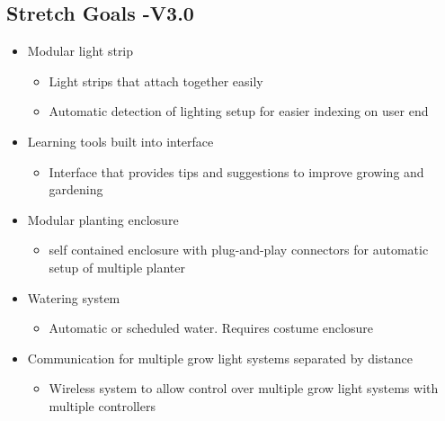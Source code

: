 \documentclass[onecolumn, draftclsnofoot,10pt, compsoc]{article}
\begin{document}
\subsection{Stretch Goals -V3.0}
\begin{itemize}
	\item Modular light strip
	\begin{itemize}
		\item Light strips that attach together easily
		\item Automatic detection of lighting setup for easier indexing on user end
	\end{itemize}
\end{itemize}
\begin{itemize}
	\item Learning tools built into interface
	\begin{itemize}
		\item Interface that provides tips and suggestions to improve growing and gardening
	\end{itemize}
\end{itemize}
\begin{itemize}
	\item Modular planting enclosure
	\begin{itemize}
		\item self contained enclosure with plug-and-play connectors for automatic setup of multiple planter
	\end{itemize}
\end{itemize}
\begin{itemize}
	\item Watering system
	\begin{itemize}
		\item Automatic or scheduled water. Requires costume enclosure
	\end{itemize}
\end{itemize}
\begin{itemize}
	\item Communication for multiple grow light systems separated by distance
	\begin{itemize}
		\item Wireless system to allow control over multiple grow light systems with multiple controllers
	\end{itemize} 
\end{itemize}
\end{document}
